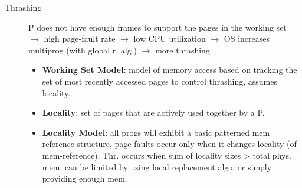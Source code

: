 \begin{description}
    \item[Thrashing] P does not have enough frames to support the pages in the working set $\rightarrow$ high page-fault rate $\rightarrow$ low CPU utilization $\rightarrow$ OS increases multiprog (with global r. alg.) $\rightarrow$ more thrashing
    \begin{itemize}
        \item \textbf{Working Set Model}: model of memory access based on tracking the set of most recently accessed pages to control thrashing, assumes locality.
        \item \textbf{Locality}: set of pages that are actively used together by a P.
        \item \textbf{Locality Model}: all progs will exhibit a basic patterned mem reference structure, page-faults occur only when it changes locality (of mem-reference). Thr. occurs when sum of locality sizes > total phys. mem, can be limited by using local replacement algo, or simply providing enough mem.
    \end{itemize} %
\end{description}
